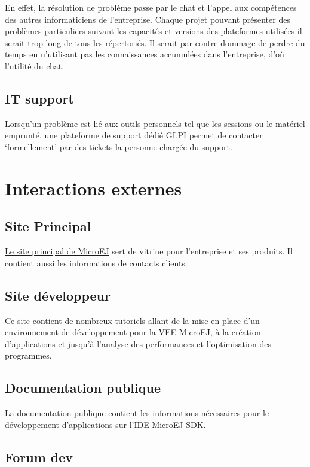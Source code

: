 \documentclass[french,a4paper,12pt]{report}
\begin{document}
En effet, la résolution de problème passe par le chat et l'appel aux compétences des autres informaticiens de l’entreprise. Chaque projet pouvant présenter des problèmes particuliers suivant les capacités et versions des plateformes utilisées il serait trop long de tous les répertoriés. Il serait par contre dommage de perdre du temps en n’utilisant pas les connaissances accumulées dans l’entreprise, d'où l'utilité du chat. 

\subsection{IT support}

Lorsqu’un problème est lié aux outils personnels tel que les sessions ou le matériel emprunté, une plateforme de support dédié GLPI permet de contacter ‘formellement’ par des tickets la personne chargée du support.

\section{Interactions externes}
\subsection{Site Principal}

\href{https://www.microej.com/}{Le site principal de MicroEJ} sert de vitrine pour l'entreprise et ses produits. Il contient aussi les informations de contacts clients.

\subsection{Site développeur}

\href{https://developer.microej.com/}{Ce site} contient de nombreux tutoriels allant de la mise en place d'un environnement de développement pour la VEE MicroEJ, à la création d'applications et jusqu'à l'analyse des performances et l'optimisation des programmes.

\subsection{Documentation publique}

\href{https://docs.microej.com/en/latest/}{La documentation publique} contient les informations nécessaires pour le développement d’applications sur l’IDE MicroEJ SDK.

\subsection{Forum dev}
\end{document}
